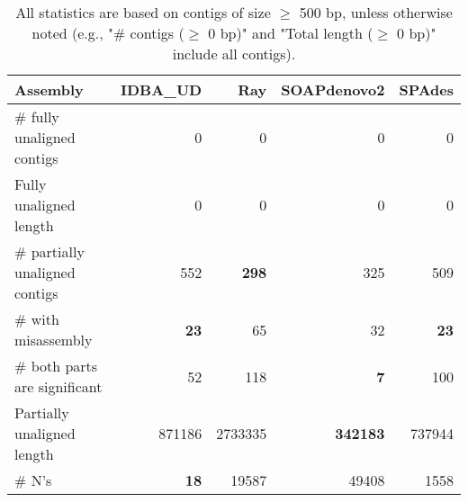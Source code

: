 \documentclass[12pt,a4paper]{article}
\begin{document}
\begin{table}[ht]
\begin{center}
\caption{All statistics are based on contigs of size $\geq$ 500 bp, unless otherwise noted (e.g., "\# contigs ($\geq$ 0 bp)" and "Total length ($\geq$ 0 bp)" include all contigs).}
\begin{tabular}{|l*{4}{|r}|}
\hline
Assembly & IDBA\_UD & Ray & SOAPdenovo2 & SPAdes \\ \hline
\# fully unaligned contigs & 0 & 0 & 0 & 0 \\ \hline
Fully unaligned length & 0 & 0 & 0 & 0 \\ \hline
\# partially unaligned contigs & 552 & {\bf 298} & 325 & 509 \\ \hline
\hspace{5mm}\# with misassembly & {\bf 23} & 65 & 32 & {\bf 23} \\ \hline
\hspace{5mm}\# both parts are significant & 52 & 118 & {\bf 7} & 100 \\ \hline
Partially unaligned length & 871186 & 2733335 & {\bf 342183} & 737944 \\ \hline
\# N's & {\bf 18} & 19587 & 49408 & 1558 \\ \hline
\end{tabular}
\end{center}
\end{table}
\end{document}
